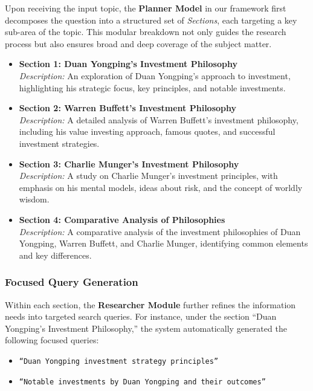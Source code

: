 \documentclass[11pt]{article}
\begin{document}
Upon receiving the input topic, the \textbf{Planner Model} in our framework first decomposes the question into a structured set of \textit{Sections}, each targeting a key sub-area of the topic. This modular breakdown not only guides the research process but also ensures broad and deep coverage of the subject matter.

\begin{itemize}
\item \textbf{Section 1: Duan Yongping's Investment Philosophy} \\
\textit{Description:} An exploration of Duan Yongping's approach to investment, highlighting his strategic focus, key principles, and notable investments.

\item \textbf{Section 2: Warren Buffett's Investment Philosophy} \\
\textit{Description:} A detailed analysis of Warren Buffett's investment philosophy, including his value investing approach, famous quotes, and successful investment strategies.

\item \textbf{Section 3: Charlie Munger's Investment Philosophy} \\
\textit{Description:} A study on Charlie Munger's investment principles, with emphasis on his mental models, ideas about risk, and the concept of worldly wisdom.

\item \textbf{Section 4: Comparative Analysis of Philosophies} \\
\textit{Description:} A comparative analysis of the investment philosophies of Duan Yongping, Warren Buffett, and Charlie Munger, identifying common elements and key differences.


\end{itemize}

\subsubsection{Focused Query Generation}

Within each section, the \textbf{Researcher Module} further refines the information needs into targeted search queries. For instance, under the section “Duan Yongping’s Investment Philosophy,” the system automatically generated the following focused queries:

\begin{itemize}
\item \texttt{“Duan Yongping investment strategy principles”}
\item \texttt{“Notable investments by Duan Yongping and their outcomes”}
\end{itemize}
\end{document}

